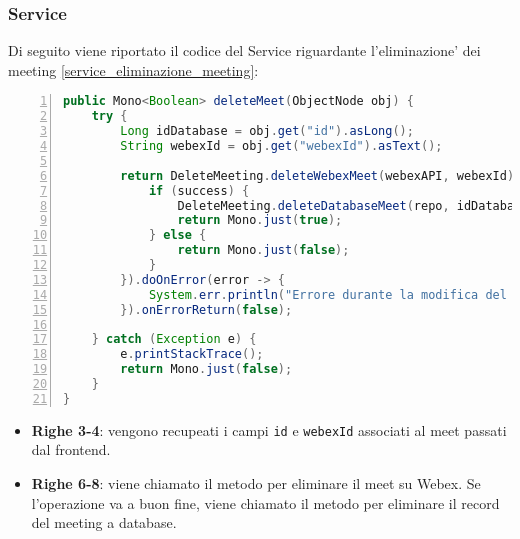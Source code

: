 \subsubsection{Service}
Di seguito viene riportato il codice del Service riguardante l'eliminazione' dei meeting \ref{service_eliminazione_meeting}: 
\begin{lstlisting}[language=java, frame=lines, basicstyle=\ttfamily\scriptsize, numbers=left, 
    caption={service eliminazione meeting}, label={service_eliminazione_meeting}]
public Mono<Boolean> deleteMeet(ObjectNode obj) {
    try {
        Long idDatabase = obj.get("id").asLong();
        String webexId = obj.get("webexId").asText();

        return DeleteMeeting.deleteWebexMeet(webexAPI, webexId).flatMap(success -> {
            if (success) {
                DeleteMeeting.deleteDatabaseMeet(repo, idDatabase);
                return Mono.just(true);
            } else {
                return Mono.just(false);
            }
        }).doOnError(error -> {
            System.err.println("Errore durante la modifica del meeting su Webex: " + error.getMessage());
        }).onErrorReturn(false);

    } catch (Exception e) {
        e.printStackTrace();
        return Mono.just(false);
    }
}
\end{lstlisting}
\begin{itemize}
    \item \textbf{Righe 3-4}: vengono recupeati i campi \texttt{id} e \texttt{webexId} associati al meet passati dal frontend. 
    \item \textbf{Righe 6-8}: viene chiamato il metodo per eliminare il meet su Webex. Se l'operazione va a buon fine, 
    viene chiamato il metodo per eliminare il record del meeting a database. 
\end{itemize}
